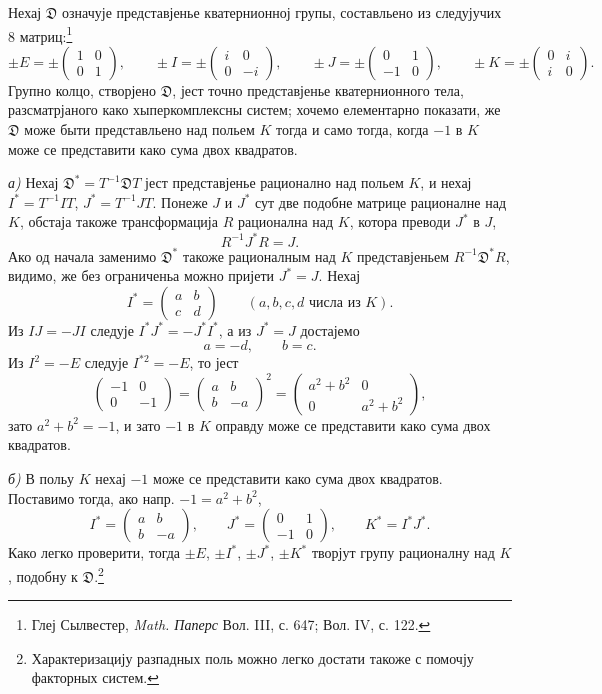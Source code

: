 ﻿\documentclass[11pt]{article}
\newcommand{\mat}[1]{\begin{pmatrix}#1\end{pmatrix}}
\begin{document}
\noindent Нехај $\mathfrak{D}$ означује представјенье кватернионној групы, составльено из следујучих 8 матриц:\footnote{Глеј Сылвестер, \emph{Math. Паперс} Вол. III, с. 647; Вол. IV, с. 122.}
\[
\pm E=\pm\mat{1&0\\0&1},\qquad
\pm I=\pm\mat{i&0\\0&-i},\qquad
\pm J=\pm\mat{0&1\\-1&0},\qquad
\pm K=\pm\mat{0&i\\ i&0}.
\]
Групно колцо, створјено $\mathfrak{D}$, јест точно представјенье кватернионного тела, разсматрјаного како хыперкомплексны систем; хочемо елементарно показати, же $\mathfrak{D}$ може быти представльено над польем $K$ тогда и само тогда, когда $-1$ в $K$ може се представити како сума двох квадратов.

\medskip

\noindent \emph{а)} Нехај $\mathfrak{D}^*=T^{-1}\mathfrak{D}T$ јест представјенье рационално над польем $K$, и нехај $I^*=T^{-1}IT$, $J^*=T^{-1}JT$. Понеже $J$ и $J^*$ сут две подобне матрице рационалне над $K$, обстаја такоже трансформација $R$ рационална над $K$, котора преводи $J^*$ в $J$,
\[
        R^{-1}J^*R=J.
\]
Ако од начала заменимо $\mathfrak{D}^*$ такоже рационалным над $K$ представјеньем $R^{-1}\mathfrak{D}^*R$, видимо, же без ограниченьа можно пријети $J^*=J$. Нехај
\[
        I^*=\mat{a&b\\ c&d}\qquad (a,b,c,d\text{ числа из }K).
\]
Из $IJ=-JI$ следује $I^*J^*=-J^*I^*$, а из $J^*=J$ достајемо
\[
        a=-d,
        \qquad b=c.
\]
Из $I^2=-E$ следује $I^{*2}=-E$, то јест
\[
        \mat{-1&0\\0&-1}=\mat{a&b\\ b&-a}^2
        =\mat{a^2+b^2&0\\0&a^2+b^2},
\]
зато $a^2+b^2=-1$, и зато $-1$ в $K$ оправду може се представити како сума двох квадратов.

\medskip

\noindent \emph{б)} В польу $K$ нехај $-1$ може се представити како сума двох квадратов. Поставимо тогда, ако напр. $-1=a^2+b^2$,
\[
        I^*=\mat{a&b\\ b&-a},\qquad
        J^*=\mat{0&1\\-1&0},\qquad
        K^*=I^*J^*.
\]
Како легко проверити, тогда $\pm E$, $\pm I^*$, $\pm J^*$, $\pm K^*$ творјут групу рационалну над $K$, подобну к $\mathfrak{D}$.\footnote{Характеризацију разпадных поль можно легко достати такоже с помочју факторных систем.}
\end{document}
